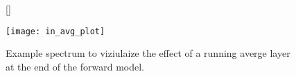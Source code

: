 \begin{figure}[H]
    [\FBwidth]
    {\caption{
        Example spectrum to viziulaize the effect of a running averge layer at the end of the forward model. 
    }
    \label{fig:in:avg_plot}}
    {\texttt{[image: in\_avg\_plot]}}
\end{figure}